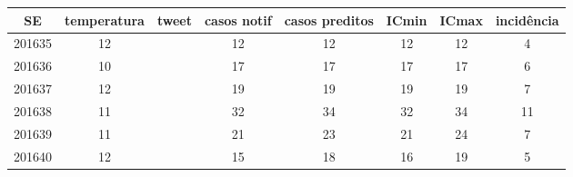 \begin{tabular}{c|ccccccc}
  \hline
SE & temperatura & tweet & casos notif & casos preditos & ICmin & ICmax & incidência \\ 
  \hline
201635 & 12 &  & 12 & 12 & 12 & 12 & 4 \\ 
  201636 & 10 &  & 17 & 17 & 17 & 17 & 6 \\ 
  201637 & 12 &  & 19 & 19 & 19 & 19 & 7 \\ 
  201638 & 11 &  & 32 & 34 & 32 & 34 & 11 \\ 
  201639 & 11 &  & 21 & 23 & 21 & 24 & 7 \\ 
  201640 & 12 &  & 15 & 18 & 16 & 19 & 5 \\ 
   \hline
\end{tabular}
